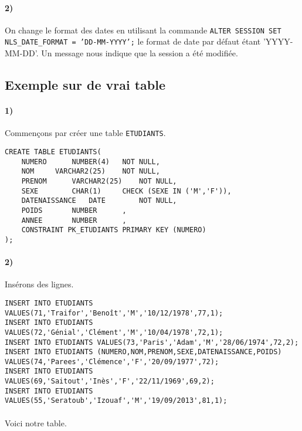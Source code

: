 \documentclass{report}
\begin{document}
\paragraph{2)}On change le format des dates en utilisant la commande {\tt ALTER SESSION SET NLS\_DATE\_FORMAT = ’DD-MM-YYYY’;} le format de date par défaut étant 'YYYY-MM-DD'. Un message nous indique que la session a été modifiée.

\subsection{Exemple sur de vrai table}

\paragraph{1)}Commençons par créer une table {\tt ETUDIANTS}.	

\begin{lstlisting}
CREATE TABLE ETUDIANTS(
	NUMERO		NUMBER(4)	NOT NULL,
	NOM		VARCHAR2(25)	NOT NULL,
	PRENOM		VARCHAR2(25)	NOT NULL,
	SEXE		CHAR(1)		CHECK (SEXE IN ('M','F')),
	DATENAISSANCE	DATE		NOT NULL,
	POIDS		NUMBER		,
	ANNEE		NUMBER		,
	CONSTRAINT PK_ETUDIANTS PRIMARY KEY (NUMERO)
);
\end{lstlisting}

\paragraph{2)}Insérons des lignes.

\begin{lstlisting}
INSERT INTO ETUDIANTS VALUES(71,'Traifor','Benoît','M','10/12/1978',77,1);
INSERT INTO ETUDIANTS VALUES(72,'Génial','Clément','M','10/04/1978',72,1);
INSERT INTO ETUDIANTS VALUES(73,'Paris','Adam','M','28/06/1974',72,2);
INSERT INTO ETUDIANTS (NUMERO,NOM,PRENOM,SEXE,DATENAISSANCE,POIDS) VALUES(74,'Parees','Clémence','F','20/09/1977',72);
INSERT INTO ETUDIANTS VALUES(69,'Saitout','Inès','F','22/11/1969',69,2);
INSERT INTO ETUDIANTS VALUES(55,'Seratoub','Izouaf','M','19/09/2013',81,1);
\end{lstlisting}

\paragraph{}Voici notre table.
\end{document}
